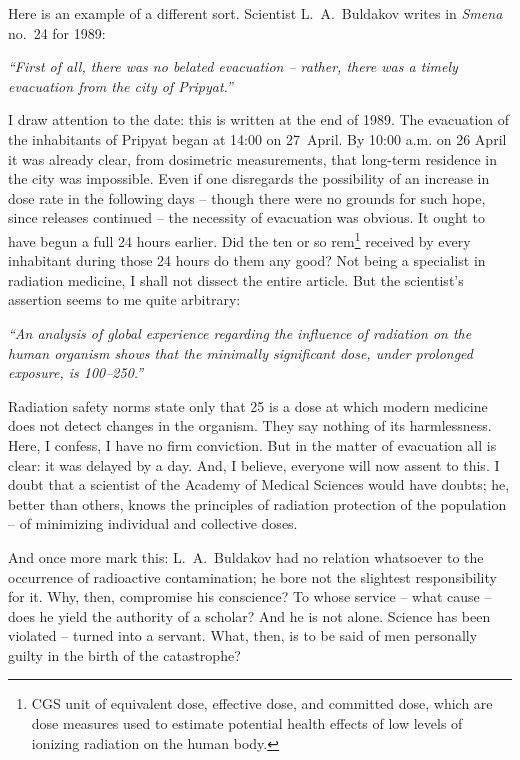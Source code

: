 \documentclass[openright]{bookest}
\begin{document}
Here is an example of a different sort. Scientist L.~A.~Buldakov writes in \textit{Smena} no.~24 for 1989:
\begin{personal}
\textit{``First of all, there was no belated evacuation -- rather, there was a timely evacuation from the city of Pripyat.''}
\end{personal}


I draw attention to the date: this is written at the end of 1989. The evacuation of the inhabitants of Pripyat began at 14:00 on 27~April. By 10:00 a.m. on 26 April it was already clear, from dosimetric measurements, that long-term residence in the city was impossible. Even if one disregards the possibility of an increase in dose rate in the following days -- though there were no grounds for such hope, since releases continued -- the necessity of evacuation was obvious. It ought to have begun a full 24 hours earlier. Did the ten or so rem\footnote{CGS unit of equivalent dose, effective dose, and committed dose, which are dose measures used to estimate potential health effects of low levels of ionizing radiation on the human body.} received by every inhabitant during those 24 hours do them any good? Not being a specialist in radiation medicine, I shall not dissect the entire article. But the scientist's assertion seems to me quite arbitrary:

\begin{personal}
\textit{``An analysis of global experience regarding the influence of radiation on the human organism shows that the minimally significant dose, under prolonged exposure, is \qtyrange{100}{250}{\rem}.''}
\end{personal}

Radiation safety norms state only that \qty{25}{\rem} is a dose at which modern medicine does not detect changes in the organism. They say nothing of its harmlessness. Here, I confess, I have no firm conviction. But in the matter of evacuation all is clear: it was delayed by a day. And, I believe, everyone will now assent to this. I doubt that a scientist of the Academy of Medical Sciences would have doubts; he, better than others, knows the principles of radiation protection of the population -- of minimizing individual and collective doses.

And once more mark this: L.~A.~Buldakov had no relation whatsoever to the occurrence of radioactive contamination; he bore not the slightest responsibility for it. Why, then, compromise his conscience? To whose service -- what cause -- does he yield the authority of a scholar? And he is not alone. Science has been violated -- turned into a servant. What, then, is to be said of men personally guilty in the birth of the catastrophe?
\end{document}
